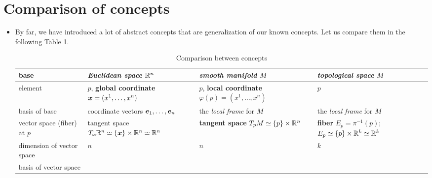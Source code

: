 \documentclass[11pt]{article}
\begin{document}
\newpage
\section{Comparison of concepts}
\begin{itemize}
\item By far, we have introduced a lot of abstract concepts that are generalization of our known concepts. Let us compare them in the following Table \ref{tab: concepts}.

\begin{table}[h!]
\centering
\caption{Comparison between concepts}
\label{tab: concepts}
\renewcommand\tabularxcolumn[1]{m{#1}}
\footnotesize
\begin{tabularx}{1\textwidth} { 
  | >{\raggedright\arraybackslash} m{2cm}
  | >{\centering\arraybackslash}X
  | >{\centering\arraybackslash}X
  | >{\centering\arraybackslash}X  | }
 \hline
 base & \emph{\textbf{Euclidean space}} ${\mathbb R}^{n}$ & \emph{\textbf{smooth manifold}} $M$ & \emph{\textbf{topological space}} $M$  \\
 \hline
 element  & $p$, \textbf{global coordinate} $\boldsymbol{x} = (x^1, \ldots, x^{n})$  & $p$, \textbf{local coordinate} $\varphi(p) = (x^1, \ldots, x^{n})$ & $p$\\
\hline
 basis of base & coordinate vectors
$\boldsymbol{e}_1, \ldots, \boldsymbol{e}_{n}$  & the \emph{local frame} for $M$ & the \emph{local frame} for $M$ \\
\hline
vector space (fiber) at $p$ & tangent space $T_{\boldsymbol{x}}{\mathbb R}^{n}  \simeq \left\{\boldsymbol{x}\right\} \times {\mathbb R}^{n} \simeq {\mathbb R}^{n}$ &  \textbf{tangent space}  $T_{p}M \simeq \left\{p\right\} \times {\mathbb R}^{n}$ & \textbf{fiber} $E_{p} = \pi^{-1}(p)$; $E_{p}  \simeq \left\{p\right\} \times {\mathbb R}^{k} \simeq {\mathbb R}^{k}$ \\
\hline
dimension of vector space & $n$ & $n$ & $k$ \\
\hline
basis of vector space &


\end{tabularx}
\end{table}
\end{itemize}
\end{document}
